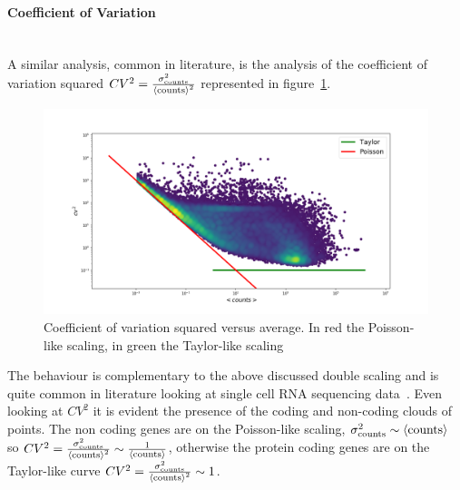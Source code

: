 \paragraph{Coefficient of Variation}\mbox{}\\
A similar analysis, common in literature, is the analysis of the coefficient of variation squared $CV^2=\frac{\sigma^2_{\mathrm{counts}}}{\left\langle \mathrm{counts}\right\rangle^2}$ represented in figure~\ref{fig:scalinglaws/gtex/allgenes/cvmean_loglog}.
\begin{figure}[htb!]
    \centering
    \includegraphics[width=0.9\linewidth]{pictures/scalinglaws/gtex/allgenes/cvmean_loglog.png}
    \caption{Coefficient of variation squared versus average. In red the Poisson-like scaling, in green the Taylor-like scaling}
    \label{fig:scalinglaws/gtex/allgenes/cvmean_loglog}
\end{figure}
The behaviour is complementary to the above discussed double scaling and is quite common in literature looking at single cell RNA sequencing data~\cite{Islam2013}. Even looking at $CV^2$ it is evident the presence of the coding and non-coding clouds of points. The non coding genes are on the Poisson-like scaling, $\sigma^2_{\mathrm{counts}} \sim \left\langle \mathrm{counts}\right\rangle$ so $CV^2=\frac{\sigma^2_{\mathrm{counts}}}{\left\langle \mathrm{counts}\right\rangle^2}\sim\frac{1}{\left\langle \mathrm{counts}\right\rangle}$, otherwise the protein coding genes are on the Taylor-like curve $CV^2=\frac{\sigma^2_{\mathrm{counts}}}{\left\langle \mathrm{counts}\right\rangle^2}\sim 1$.

